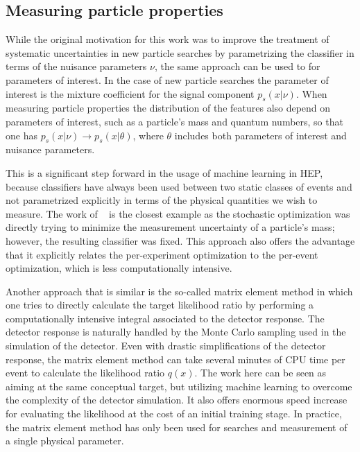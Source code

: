 \documentclass[11pt, oneside]{article}   	%
\begin{document}

\subsection{Measuring particle properties}

While the original motivation for this work was to improve the treatment of systematic uncertainties in new particle searches by parametrizing the classifier in terms of the nuisance parameters $\nu$, the same approach can be used to for parameters of interest. In the case of new particle searches the parameter of interest is the mixture coefficient for the signal component $p_s(x|\nu)$. When measuring particle properties the distribution of the features also depend on parameters of interest, such as a particle's mass and quantum numbers, so that one has $p_s(x|\nu) \to p_s(x|\theta)$, where $\theta$ includes both parameters of interest and nuisance parameters. 

This is a significant step forward in the usage of machine learning in HEP, because classifiers have always been used between two static classes of events and not parametrized explicitly in terms of the physical quantities we wish to measure. The work of  ~\citep{Whiteson:2006ws} is the closest example as the stochastic optimization was directly trying to minimize the measurement uncertainty of a particle's mass; however, the resulting classifier was fixed. This approach also offers the advantage that it explicitly relates the per-experiment optimization to the per-event optimization, which is less computationally intensive.

Another approach that is similar is the so-called matrix element method in which one tries to directly calculate the target likelihood ratio by performing a computationally intensive integral associated to the detector response. The detector response is naturally handled by the Monte Carlo sampling used in the simulation of the detector. Even with drastic simplifications of the detector response, the matrix element method can take several minutes of CPU time per event to calculate the likelihood ratio $q(x)$. The work here can be seen as aiming at the same conceptual target, but utilizing machine learning to overcome the complexity of the detector simulation. It also offers enormous speed increase for evaluating the likelihood at the cost of an initial training stage. In practice, the matrix element method has only been used for searches and measurement of a single physical parameter.
\end{document}
